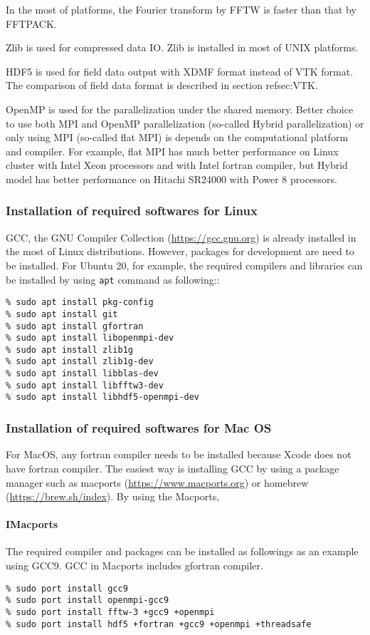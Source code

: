 In the most of platforms, the Fourier transform by FFTW is faster than that by FFTPACK. 

Zlib is used for compressed data IO. Zlib is installed in most of UNIX platforms.

HDF5 is used for field data output with XDMF format instead of VTK format. The comparison of field data format is described in section ref{sec:VTK}. 

OpenMP is used for the parallelization under the shared memory. Better choice to use both MPI and OpenMP parallelization (so-called Hybrid parallelization) or only using MPI (so-called flat MPI) is depends on the computational platform and compiler. For example, flat MPI has much better performance on Linux cluster with Intel Xeon processors and with Intel fortran compiler, but Hybrid model has better performance on Hitachi SR24000 with Power 8 processors.

\subsubsection{Installation of required softwares for Linux}
GCC, the GNU Compiler Collection (\url{https://gcc.gnu.org}) is already installed in the most of Linux distributions. However, packages for development are need to be installed. For Ubuntu 20, for example, the required compilers and  libraries can be installed by using \verb|apt| command as following::
%
\begin{verbatim}
% sudo apt install pkg-config
% sudo apt install git
% sudo apt install gfortran
% sudo apt install libopenmpi-dev
% sudo apt install zlib1g
% sudo apt install zlib1g-dev
% sudo apt install libblas-dev
% sudo apt install libfftw3-dev
% sudo apt install libhdf5-openmpi-dev
\end{verbatim}

 
\subsubsection{Installation of required softwares for Mac OS}
For MacOS, any fortran compiler needs to be installed because Xcode does not have fortran compiler. The easiest way is installing GCC by using a package manager such as macports (\url{https://www.macports.org}) or homebrew (\url{https://brew.sh/index}). By using the Macports, 

\paragraph{IMacports}
The required compiler and packages can be installed as followings as an example using GCC9. GCC in Macports includes gfortran compiler.
%
\begin{verbatim}
% sudo port install gcc9
% sudo port install openmpi-gcc9
% sudo port install fftw-3 +gcc9 +openmpi
% sudo port install hdf5 +fortran +gcc9 +openmpi +threadsafe
\end{verbatim}


